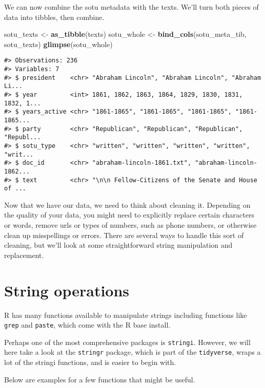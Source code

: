 \documentclass[]{book}
\newenvironment{Shaded}{\begin{snugshade}}{\end{snugshade}}
\newcommand{\KeywordTok}[1]{\textcolor[rgb]{0.13,0.29,0.53}{\textbf{#1}}}
\newcommand{\NormalTok}[1]{#1}
\newcommand{\StringTok}[1]{\textcolor[rgb]{0.31,0.60,0.02}{#1}}
\begin{document}
We can now combine the sotu metadata with the texts. We'll turn both pieces of data into tibbles, then combine.

\begin{Shaded}
\begin{Highlighting}[]
\NormalTok{sotu_texts <-}\StringTok{ }\KeywordTok{as_tibble}\NormalTok{(texts)}
\NormalTok{sotu_whole <-}\StringTok{ }\KeywordTok{bind_cols}\NormalTok{(sotu_meta_tib, sotu_texts)}
\KeywordTok{glimpse}\NormalTok{(sotu_whole)}
\end{Highlighting}
\end{Shaded}

\begin{verbatim}
#> Observations: 236
#> Variables: 7
#> $ president    <chr> "Abraham Lincoln", "Abraham Lincoln", "Abraham Li...
#> $ year         <int> 1861, 1862, 1863, 1864, 1829, 1830, 1831, 1832, 1...
#> $ years_active <chr> "1861-1865", "1861-1865", "1861-1865", "1861-1865...
#> $ party        <chr> "Republican", "Republican", "Republican", "Republ...
#> $ sotu_type    <chr> "written", "written", "written", "written", "writ...
#> $ doc_id       <chr> "abraham-lincoln-1861.txt", "abraham-lincoln-1862...
#> $ text         <chr> "\n\n Fellow-Citizens of the Senate and House of ...
\end{verbatim}

Now that we have our data, we need to think about cleaning it. Depending on the quality of your data, you might need to explicitly replace certain characters or words, remove urls or types of numbers, such as phone numbers, or otherwise clean up misspellings or errors. There are several ways to handle this sort of cleaning, but we'll look at some straightforward string manipulation and replacement.

\hypertarget{string-operations}{%
\section{String operations}\label{string-operations}}

R has many functions available to manipulate strings including functions like \texttt{grep} and \texttt{paste}, which come with the R base install.

Perhaps one of the most comprehensive packages is \texttt{stringi}. However, we will here take a look at the \texttt{stringr} package, which is part of the \texttt{tidyverse}, wraps a lot of the stringi functions, and is easier to begin with.

Below are examples for a few functions that might be useful.
\end{document}
